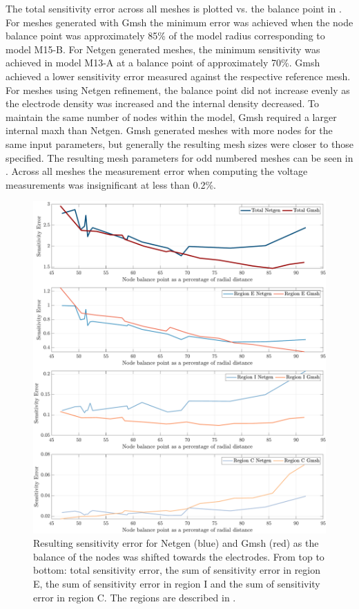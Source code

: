 The total sensitivity error across all meshes is plotted vs. the balance point in
. For meshes generated with Gmsh the minimum error was 
achieved when the node balance point was approximately 85\% of the model radius corresponding
to model M15-B. 
For Netgen generated meshes, the minimum sensitivity was achieved in model M13-A at a balance point
of approximately 70\%. Gmsh achieved a lower sensitivity error measured against
the respective reference mesh. For meshes using Netgen refinement, the balance point did not
increase evenly as the electrode density was increased and the internal density decreased. 
To maintain the same number of nodes within the model, Gmsh required a larger internal maxh
than Netgen. Gmsh generated meshes with more nodes for the same input
parameters, but  generally the resulting mesh sizes were closer to those specified. The
resulting mesh parameters for odd numbered meshes can be seen in .
Across all meshes the measurement error when computing the voltage measurements was insignificant
at less than 0.2\%.

\begin{figure}[H]
  \includegraphics[width=\columnwidth]{chapter4-mesh_refinement/imgs/m-mesh_sens_error_regions_split.pdf}
  \caption[Sensitivity error with shifting node balance]{\label{fig:balance_sens}
  Resulting sensitivity error for Netgen (blue) and Gmsh (red) as the balance of the nodes
  was shifted towards the electrodes. From top to bottom: total sensitivity error, the sum of 
  sensitivity error in region E, the sum of sensitivity error in region I and the sum of
  sensitivity error in region C. The regions are described in .}
\end{figure}

